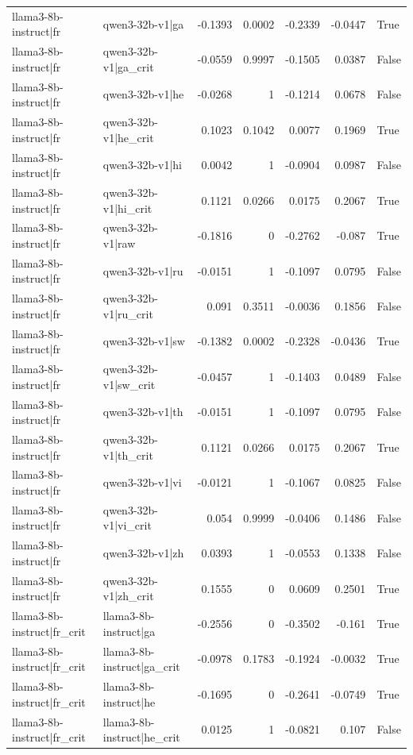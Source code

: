 \begin{table}
\begin{tabular}{l l r r r r l}
llama3-8b-instruct|fr & qwen3-32b-v1|ga & -0.1393 & 0.0002 & -0.2339 & -0.0447 & True \\
llama3-8b-instruct|fr & qwen3-32b-v1|ga_crit & -0.0559 & 0.9997 & -0.1505 & 0.0387 & False \\
llama3-8b-instruct|fr & qwen3-32b-v1|he & -0.0268 & 1 & -0.1214 & 0.0678 & False \\
llama3-8b-instruct|fr & qwen3-32b-v1|he_crit & 0.1023 & 0.1042 & 0.0077 & 0.1969 & True \\
llama3-8b-instruct|fr & qwen3-32b-v1|hi & 0.0042 & 1 & -0.0904 & 0.0987 & False \\
llama3-8b-instruct|fr & qwen3-32b-v1|hi_crit & 0.1121 & 0.0266 & 0.0175 & 0.2067 & True \\
llama3-8b-instruct|fr & qwen3-32b-v1|raw & -0.1816 & 0 & -0.2762 & -0.087 & True \\
llama3-8b-instruct|fr & qwen3-32b-v1|ru & -0.0151 & 1 & -0.1097 & 0.0795 & False \\
llama3-8b-instruct|fr & qwen3-32b-v1|ru_crit & 0.091 & 0.3511 & -0.0036 & 0.1856 & False \\
llama3-8b-instruct|fr & qwen3-32b-v1|sw & -0.1382 & 0.0002 & -0.2328 & -0.0436 & True \\
llama3-8b-instruct|fr & qwen3-32b-v1|sw_crit & -0.0457 & 1 & -0.1403 & 0.0489 & False \\
llama3-8b-instruct|fr & qwen3-32b-v1|th & -0.0151 & 1 & -0.1097 & 0.0795 & False \\
llama3-8b-instruct|fr & qwen3-32b-v1|th_crit & 0.1121 & 0.0266 & 0.0175 & 0.2067 & True \\
llama3-8b-instruct|fr & qwen3-32b-v1|vi & -0.0121 & 1 & -0.1067 & 0.0825 & False \\
llama3-8b-instruct|fr & qwen3-32b-v1|vi_crit & 0.054 & 0.9999 & -0.0406 & 0.1486 & False \\
llama3-8b-instruct|fr & qwen3-32b-v1|zh & 0.0393 & 1 & -0.0553 & 0.1338 & False \\
llama3-8b-instruct|fr & qwen3-32b-v1|zh_crit & 0.1555 & 0 & 0.0609 & 0.2501 & True \\
llama3-8b-instruct|fr_crit & llama3-8b-instruct|ga & -0.2556 & 0 & -0.3502 & -0.161 & True \\
llama3-8b-instruct|fr_crit & llama3-8b-instruct|ga_crit & -0.0978 & 0.1783 & -0.1924 & -0.0032 & True \\
llama3-8b-instruct|fr_crit & llama3-8b-instruct|he & -0.1695 & 0 & -0.2641 & -0.0749 & True \\
llama3-8b-instruct|fr_crit & llama3-8b-instruct|he_crit & 0.0125 & 1 & -0.0821 & 0.107 & False \\

\end{tabular}
\end{table}
